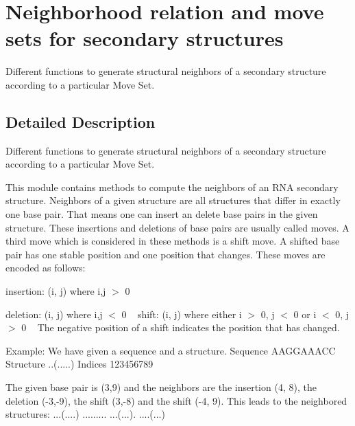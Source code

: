 \hypertarget{group__neighbors}{}\section{Neighborhood relation and move sets for secondary structures}
\label{group__neighbors}


Different functions to generate structural neighbors of a secondary structure according to a particular Move Set.  




\subsection{Detailed Description}
Different functions to generate structural neighbors of a secondary structure according to a particular Move Set. 

This module contains methods to compute the neighbors of an R\+NA secondary structure. Neighbors of a given structure are all structures that differ in exactly one base pair. That means one can insert an delete base pairs in the given structure. These insertions and deletions of base pairs are usually called moves. A third move which is considered in these methods is a shift move. A shifted base pair has one stable position and one position that changes. These moves are encoded as follows\+: ~\newline

\begin{DoxyItemize}
\item insertion\+: (i, j) where i,j $>$ 0 ~\newline

\item deletion\+: (i, j) where i,j $<$ 0 ~\newline
 shift\+: (i, j) where either i $>$ 0, j $<$ 0 or i $<$ 0, j $>$ 0 ~\newline
 The negative position of a shift indicates the position that has changed.
\end{DoxyItemize}


\begin{DoxyCode}
Example:
         We have given a sequence and a structure.
         Sequence  AAGGAAACC
         Structure ..(.....)
         Indices   123456789

         The given base pair is (3,9) and the neighbors are the insertion (4, 8), the deletion (-3,-9), the
       shift (3,-8)
         and the shift (-4, 9).
         This leads to the neighbored structures:
         ...(....)
         .........
         ...(...).
         ....(...)
\end{DoxyCode}


